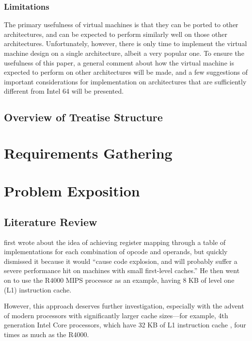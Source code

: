 		\subsection{Limitations}
			The primary usefulness of virtual machines is that they can be ported to other architectures, and can be expected to perform similarly well on those other architectures. Unfortunately, however, there is only time to implement the virtual machine design on a single architecture, albeit a very popular one. To ensure the usefulness of this paper, a general comment about how the virtual machine is expected to perform on other architectures will be made, and a few suggestions of important considerations for implementation on architectures that are sufficiently  different from Intel 64 will be presented.
				
	\section{Overview of Treatise Structure}
	
\chapter{Requirements Gathering}
\chapter{Problem Exposition}
	\section{Literature Review}
		\cite{stackcaching} first wrote about the idea of achieving register mapping through a table of implementations for each combination of opcode and operands, but quickly dismissed it because it would ``cause code explosion, and will probably suffer a severe performance hit on machines with small first-level caches.'' He then went on to use the R4000 MIPS processor as an example, having 8 KB of level one (L1) instruction cache.
	
		However, this approach deserves further investigation, especially with the advent of modern processors with significantly larger cache sizes---for example, 4th generation Intel Core processors, which have 32 KB of L1 instruction cache \citep{haswellarch}, four times as much as the R4000.
	
